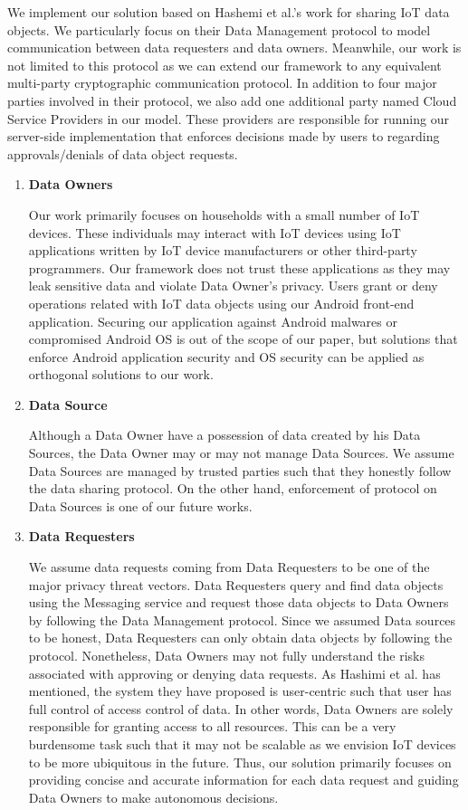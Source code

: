 We implement our solution based on Hashemi et al.'s \cite{campbell} work for sharing IoT data objects. We particularly focus on their Data Management protocol to model communication between data requesters and data owners. Meanwhile, our work is not limited to this protocol as we can extend our framework to any equivalent multi-party cryptographic communication protocol. In addition to four major parties involved in their protocol, we also add one additional party named Cloud Service Providers in our model. These providers are responsible for running our server-side implementation that enforces decisions made by users to regarding approvals/denials of data object requests. 

\begin{enumerate}
\item \textbf {Data Owners} 

Our work primarily focuses on households with a small number of IoT devices. These individuals may interact with IoT devices using IoT applications written by IoT device manufacturers or other third-party programmers. Our framework does not trust these applications as they may leak sensitive data and violate Data Owner's privacy. Users grant or deny operations related with IoT data objects using our Android front-end  application. Securing our application against Android malwares or compromised Android OS is out of the scope of our paper, but solutions that enforce Android application security and OS security \cite{tz} can be applied as orthogonal solutions to our work. 

\item \textbf{Data Source} 

Although a Data Owner have a possession of data created by his Data Sources, the Data Owner may or may not manage Data Sources. We assume Data Sources are managed by trusted parties such that they honestly follow the data sharing protocol. On the other hand, enforcement of protocol on Data Sources is one of our future works. 

\item \textbf {Data Requesters}

We assume data requests coming from Data Requesters to be one of the major privacy threat vectors. Data Requesters query and find data objects using the Messaging service and request those data objects to Data Owners by following the Data Management protocol. Since we assumed Data sources to be honest, Data Requesters can only obtain data objects by following the protocol. Nonetheless, Data Owners may not fully understand the risks associated with approving or denying data requests. As Hashimi et al. has mentioned, the system they have proposed is user-centric such that user has full control of access control of data. In other words, Data Owners are solely responsible for granting access to all resources. This can be a very burdensome task such that it may not be scalable as we envision IoT devices to be more ubiquitous in the future. Thus, our solution primarily focuses on providing concise and accurate information for each data request and guiding Data Owners to make autonomous decisions.


\end{enumerate}
